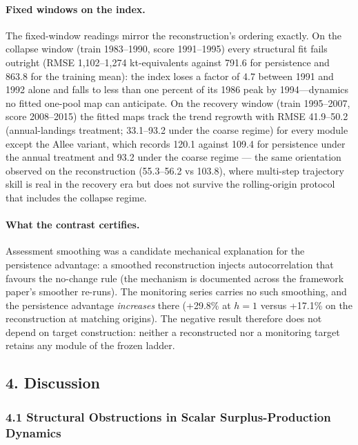 \documentclass[11pt]{article}
\begin{document}
\paragraph{Fixed windows on the
index.}\label{fixed-windows-on-the-index.}

The fixed-window readings mirror the reconstruction's ordering exactly.
On the collapse window (train 1983--1990, score 1991--1995) every
structural fit fails outright (RMSE 1,102--1,274 kt-equivalents against
791.6 for persistence and 863.8 for the training mean): the index loses
a factor of 4.7 between 1991 and 1992 alone and falls to less than one
percent of its 1986 peak by 1994---dynamics no fitted one-pool map can
anticipate. On the recovery window (train 1995--2007, score 2008--2015)
the fitted maps track the trend regrowth with RMSE 41.9--50.2
(annual-landings treatment; 33.1--93.2 under the coarse regime) for
every module except the Allee variant, which records 120.1 against 109.4
for persistence under the annual treatment and 93.2 under the coarse
regime --- the same orientation observed on the reconstruction
(55.3--56.2 vs 103.8), where multi-step trajectory skill is real in the
recovery era but does not survive the rolling-origin protocol that
includes the collapse regime.

\paragraph{What the contrast
certifies.}\label{what-the-contrast-certifies.}

Assessment smoothing was a candidate mechanical explanation for the
persistence advantage: a smoothed reconstruction injects autocorrelation
that favours the no-change rule (the mechanism is documented across the
framework paper's smoother re-runs). The monitoring series carries no
such smoothing, and the persistence advantage \emph{increases} there
(+29.8\% at \(h=1\) versus +17.1\% on the reconstruction at matching
origins). The negative result therefore does not depend on target
construction: neither a reconstructed nor a monitoring target retains
any module of the frozen ladder.

\subsection{4. Discussion}\label{discussion}

\subsubsection{4.1 Structural Obstructions in Scalar Surplus-Production
Dynamics}\label{structural-obstructions-in-scalar-surplus-production-dynamics}
\end{document}
